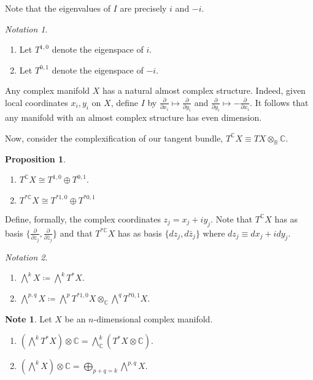 \documentclass[10pt,letterpaper,cm]{nupset}
\theoremstyle{definition}
\newtheorem{note}[defn]{Note}
\theoremstyle{theorem}
\newtheorem{prop}[defn]{Proposition}
\theoremstyle{remark}
\newtheorem*{notation}{Notation}
\newcommand{\C}{\mathbb C}
\newcommand{\R}{\mathbb{R}}
\newcommand{\1}{\mathbb{1}}
\newcommand{\0}{\vec 0}
\newcommand{\be}{\begin{enumerate}}
\newcommand{\ee}{\end{enumerate}}
\begin{document}
Note that the eigenvalues of $I$ are precisely $i$ and ${-i}$.

\begin{notation} $ $
\be
\item Let $T^{1,0}$ denote the eigenspace of $i$.
\item  Let $T^{0,1}$ denote the eigenspace of ${-i}$.
\ee
\end{notation}

Any complex manifold $X$ has a natural almost complex structure. Indeed, given local coordinates $x_i, y_i$ on $X$, define $I$ by $\frac{\partial}{\partial{x_i}} \mapsto \frac{\partial}{\partial{y_i}}$ and $\frac{\partial}{\partial{y_i}} \mapsto {-\frac{\partial}{\partial{x_i}}}$. It follows that any manifold with an almost complex structure has even dimension.

\medskip

Now, consider the  complexification of our tangent bundle, $T^{\C}{X} \equiv T{X} \otimes_{\R}\C$.  

\begin{prop} $ $
\be
\item $T^{\C}{X} \cong T^{1,0} \oplus T^{0,1}$.
\item $T^{\ast{\C}}{X} \cong T^{\ast{1,0}}\oplus T^{\ast{0,1}}$
\ee
\end{prop}

Define, formally, the complex coordinates $z_j = x_j + iy_j$. Note that $T^{\C}{X}$ has as basis $\{\frac{\partial}{\partial{z_j}}, \frac{\partial}{\partial{\bar{z}_j}}\}$ and that $T^{\ast{\C}}{X}$ has as basis $\{d{z_j}, d{\bar{z}_j}\}$ where $d{z_j} \equiv d{x_j} + id{y_j}$.

\begin{notation} $ $
\be
\item $\bigwedge^k{X} \coloneqq \bigwedge^k{T^{\ast}{X}}$.
\item $\bigwedge^{p,q}{X} \coloneqq \bigwedge^p{T^{\ast{1,0}}}{X} \otimes_{\C} \bigwedge^q{T^{\ast{0,1}}}{X}$.
\ee
\end{notation}

\begin{note}\label{decomp} Let $X$ be an $n$-dimensional complex manifold.
\be
\item $\left(\bigwedge^k{T^{\ast}{X}}\right) \otimes \C = \bigwedge^k_{\C}\left(T^{\ast}{X} \otimes \C\right)$.
\item $\left(\bigwedge^k{X}\right) \otimes \C = \bigoplus_{p+q = k} \bigwedge^{p,q}{X}$.
\ee
\end{note}
\end{document}

